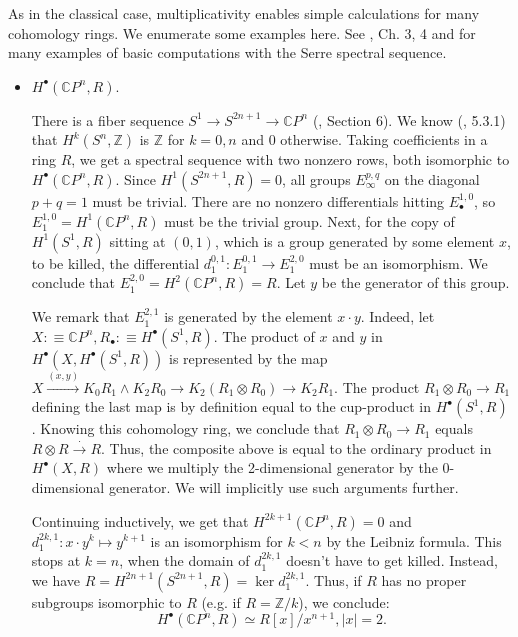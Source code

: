 \documentclass{amsart}
\theoremstyle{definition}
\newcommand{\ZZ}{\mathbb{Z}}
\newcommand{\CC}{\mathbb{C}}
\begin{document}
As in the classical case, multiplicativity enables simple calculations for many cohomology rings. We enumerate some examples here. See \cite{FF}, Ch. 3, 4 and \cite{Hat5} for many examples of basic computations with the Serre spectral sequence.

\begin{itemize}
\item
    $H^\bullet(\CC P^n, R)$.

    There is a fiber sequence $S^1 \to S^{2n+1} \to \CC P^n$ (\cite{BR}, Section 6). We know (\cite{Bru}, 5.3.1) that $H^k(S^n, \ZZ)$ is $\ZZ$ for $k = 0, n$ and $0$ otherwise. Taking coefficients in a ring $R$, we get a spectral sequence with two nonzero rows, both isomorphic to $H^\bullet(\CC P^n, R).$ Since $H^1(S^{2n+1}, R) = 0$, all groups $E_{\infty}^{p,q}$ on the diagonal $p+q = 1$ must be trivial. There are no nonzero differentials hitting $E_{\bullet}^{1,0}$, so $E_1^{1,0} = H^1(\CC P^n, R)$ must be the trivial group. Next, for the copy of $H^1(S^1, R)$ sitting at $(0,1)$, which is a group generated by some element $x$, to be killed, the differential $d_1^{0,1}: E_1^{0,1} \to E_1^{2,0}$ must be an isomorphism. We conclude that $E_1^{2,0} = H^2(\CC P^n, R) = R$. Let $y$ be the generator of this group.

    We remark that $E_1^{2,1}$ is generated by the element $x \cdot y$. Indeed, let $X : \equiv \CC P^n, R_\bullet :\equiv H^\bullet(S^1, R)$. The product of $x$ and $y$ in $H^\bullet(X , H^{\bullet}(S^1, R))$ is represented by the map $X \xrightarrow{(x,y)} K_0 R_1 \wedge K_2 R_0 \xrightarrow{} K_2 (R_1 \otimes R_0) \to K_2 R_1$. The product $R_1 \otimes R_0 \to R_1$ defining the last map is by definition equal to the cup-product in $H^\bullet(S^1, R)$. Knowing this cohomology ring, we conclude that $R_1 \otimes R_0 \to R_1$ equals $R \otimes R \xrightarrow{\cdot} R$.
    Thus, the composite above is equal to the ordinary product in $H^\bullet(X, R)$ where we multiply the 2-dimensional generator by the 0-dimensional generator. We will implicitly use such arguments further.

    Continuing inductively, we get that $H^{2k+1}(\CC P^n, R) = 0$ and $d_1^{2k,1}: x \cdot y^k \mapsto y^{k+1} $ is an isomorphism for $k < n$ by the Leibniz formula. This stops at $k=n$, when the domain of $d_1^{2k,1}$ doesn't have to get killed. Instead, we have $R = H^{2n+1}(S^{2n+1}, R) = \ker d_1^{2k,1}$. Thus, if $R$ has no proper subgroups isomorphic to $R$ (e.g. if $R = \ZZ/k$), we conclude:
    $$H^\bullet(\CC P^n, R) \simeq R[x]/x^{n+1}, |x| = 2.$$


\end{itemize}
\end{document}
